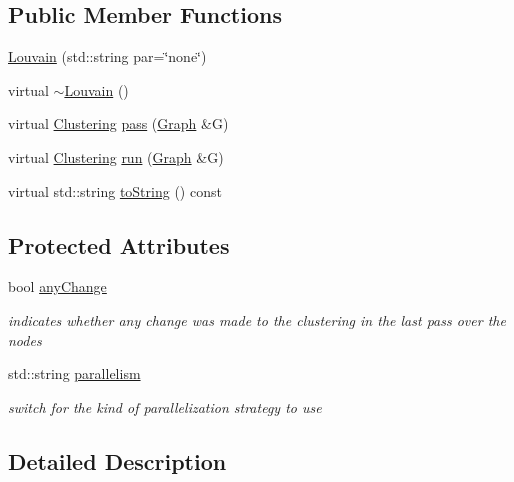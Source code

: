 \subsection*{Public Member Functions}
\begin{DoxyCompactItemize}
\item 
\hyperlink{class_ensemble_clustering_1_1_louvain_a4404cb2e26ffff19559d3cdf06822a04}{Louvain} (std\-::string par=\char`\"{}none\char`\"{})
\item 
virtual \hyperlink{class_ensemble_clustering_1_1_louvain_a6ae688d241039fa8b431161ebb127889}{$\sim$\-Louvain} ()
\item 
virtual \hyperlink{class_ensemble_clustering_1_1_clustering}{Clustering} \hyperlink{class_ensemble_clustering_1_1_louvain_a62e11b018023c879a768f688a4791a94}{pass} (\hyperlink{class_ensemble_clustering_1_1_graph}{Graph} \&G)
\item 
virtual \hyperlink{class_ensemble_clustering_1_1_clustering}{Clustering} \hyperlink{class_ensemble_clustering_1_1_louvain_abc6d8ce42bcc51e1913dc0be34cfb2b8}{run} (\hyperlink{class_ensemble_clustering_1_1_graph}{Graph} \&G)
\item 
virtual std\-::string \hyperlink{class_ensemble_clustering_1_1_louvain_af86f67cf0c83abf0af7c149c158342c5}{to\-String} () const 
\end{DoxyCompactItemize}
\subsection*{Protected Attributes}
\begin{DoxyCompactItemize}
\item 
bool \hyperlink{class_ensemble_clustering_1_1_louvain_ac8a5173b778e41308a9504216ff9ddd7}{any\-Change}
\begin{DoxyCompactList}\small\item\em indicates whether any change was made to the clustering in the last pass over the nodes \end{DoxyCompactList}\item 
std\-::string \hyperlink{class_ensemble_clustering_1_1_louvain_aef8ac84e212816b649e3a3f463741228}{parallelism}
\begin{DoxyCompactList}\small\item\em switch for the kind of parallelization strategy to use \end{DoxyCompactList}\end{DoxyCompactItemize}


\subsection{Detailed Description}


